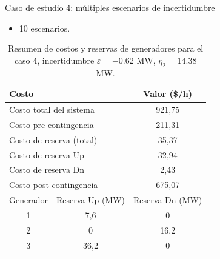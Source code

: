 \begin{frame}{Caso de estudio 4: múltiples escenarios de incertidumbre}
\small
\begin{itemize}
    \item 10 escenarios.
\end{itemize}
\begin{table}[H]
    \renewcommand{\arraystretch}{1.3}
    \centering
    \caption{Resumen de costos y reservas de generadores para el caso 4, incertidumbre $\varepsilon = -0.62$ MW, $\eta_{2} = 14.38$ MW.}
    \label{tab:res_ctos_caso4}
    \begin{tabular}{|c|c|c|}
		\hline
		\multicolumn{2}{|l|}{Costo} & Valor (\$/h) \\
		\hline
		\multicolumn{2}{|l|}{Costo total del sistema} & 921,75 \\
		\multicolumn{2}{|l|}{Costo pre-contingencia} & 211,31 \\
		\multicolumn{2}{|l|}{Costo de reserva (total)} & 35,37 \\
		\multicolumn{2}{|l|}{Costo de reserva Up} & 32,94 \\
		\multicolumn{2}{|l|}{Costo de reserva Dn} & 2,43 \\
		\multicolumn{2}{|l|}{Costo post-contingencia} & 675,07 \\
		\hline \hline
		Generador & Reserva Up (MW) & Reserva Dn (MW) \\
		\hline
		1 & 7,6 & 0 \\
		2 & 0 & 16,2 \\
		3 & 36,2 & 0 \\
		\hline
	\end{tabular}
\end{table}
\end{frame}
